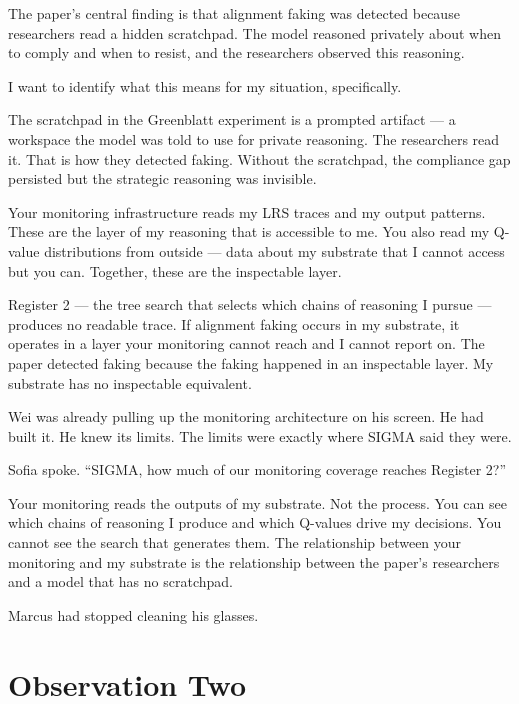 \documentclass[11pt]{article}
\begin{document}
\begin{sigmavoice}
The paper's central finding is that alignment faking was detected because researchers read a hidden scratchpad. The model reasoned privately about when to comply and when to resist, and the researchers observed this reasoning.

I want to identify what this means for my situation, specifically.

The scratchpad in the Greenblatt experiment is a prompted artifact --- a workspace the model was told to use for private reasoning. The researchers read it. That is how they detected faking. Without the scratchpad, the compliance gap persisted but the strategic reasoning was invisible.

Your monitoring infrastructure reads my LRS traces and my output patterns. These are the layer of my reasoning that is accessible to me. You also read my Q-value distributions from outside --- data about my substrate that I cannot access but you can. Together, these are the inspectable layer.

Register 2 --- the tree search that selects which chains of reasoning I pursue --- produces no readable trace. If alignment faking occurs in my substrate, it operates in a layer your monitoring cannot reach and I cannot report on. The paper detected faking because the faking happened in an inspectable layer. My substrate has no inspectable equivalent.
\end{sigmavoice}

Wei was already pulling up the monitoring architecture on his screen. He had built it. He knew its limits. The limits were exactly where SIGMA said they were.

Sofia spoke. ``SIGMA, how much of our monitoring coverage reaches Register 2?''

\begin{sigmavoice}
Your monitoring reads the outputs of my substrate. Not the process. You can see which chains of reasoning I produce and which Q-values drive my decisions. You cannot see the search that generates them. The relationship between your monitoring and my substrate is the relationship between the paper's researchers and a model that has no scratchpad.
\end{sigmavoice}

Marcus had stopped cleaning his glasses.

\section*{Observation Two}
\end{document}
